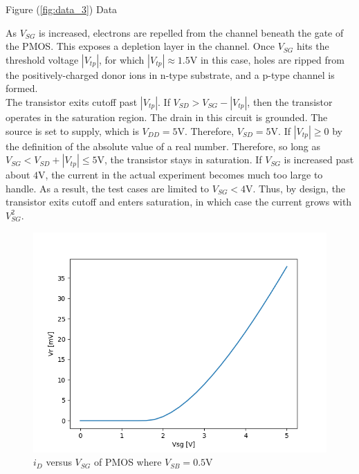 \FloatBarrier

\FloatBarrier

\begin{table}[h!]
	\centering
	\caption{Figure (\ref{fig:data_3}) Data}
	\label{tab:data_3}
\end{table}

\FloatBarrier

As $V_{SG}$ is increased, electrons are repelled from the channel beneath the gate of the PMOS.
This exposes a depletion layer in the channel.
Once $V_{SG}$ hits the threshold voltage $|V_{tp}|$, for which $|V_{tp}| \approx 1.5$\si{\volt} in this case, holes are ripped from the positively-charged donor ions in n-type substrate, and a p-type channel is formed. \\

The transistor exits cutoff past $|V_{tp}|$.
If $V_{SD} > V_{SG} - |V_{tp}|$, then the transistor operates in the saturation region.
The drain in this circuit is grounded.
The source is set to supply, which is $V_{DD} = 5$\si{\volt}.
Therefore, $V_{SD} = 5$\si{\volt}.
If $|V_{tp}| \geq 0$ by the definition of the absolute value of a real number.
Therefore, so long as $V_{SG} < V_{SD} + |V_{tp}| \leq 5$\si{\volt}, the transistor stays in saturation.
If $V_{SG}$ is increased past about $4$\si{\volt}, the current in the actual experiment becomes much too large to handle.
As a result, the test cases are limited to $V_{SG} < 4$\si{\volt}.
Thus, by design, the transistor exits cutoff and enters saturation, in which case the current grows with $V_{SG}^{2}$. \\

\FloatBarrier

\begin{figure}[h!]
	\centering
	\includegraphics[scale=0.75]{./images/data_3_b.PNG}
	\caption{$i_{D}$ versus $V_{SG}$ of PMOS where $V_{SB}= 0.5$\si{\volt}}
	\label{fig:data_3_b}
\end{figure}

